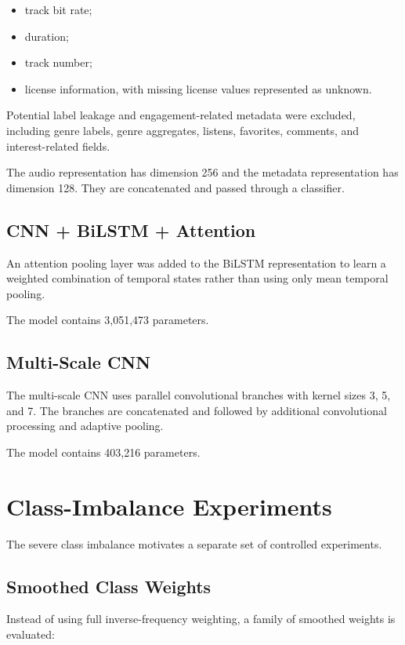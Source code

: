 \documentclass[11pt,a4paper]{article}
\begin{document}
\begin{itemize}
    \item track bit rate;
    \item duration;
    \item track number;
    \item license information, with missing license values represented as unknown.
\end{itemize}

Potential label leakage and engagement-related metadata were excluded, including genre labels, genre aggregates, listens, favorites, comments, and interest-related fields.

The audio representation has dimension 256 and the metadata representation has dimension 128. They are concatenated and passed through a classifier.

\subsection{CNN + BiLSTM + Attention}

An attention pooling layer was added to the BiLSTM representation to learn a weighted combination of temporal states rather than using only mean temporal pooling.

The model contains 3,051,473 parameters.

\subsection{Multi-Scale CNN}

The multi-scale CNN uses parallel convolutional branches with kernel sizes 3, 5, and 7. The branches are concatenated and followed by additional convolutional processing and adaptive pooling.

The model contains 403,216 parameters.

\section{Class-Imbalance Experiments}

The severe class imbalance motivates a separate set of controlled experiments.

\subsection{Smoothed Class Weights}


Instead of using full inverse-frequency weighting, a family of smoothed weights is evaluated:
\end{document}
